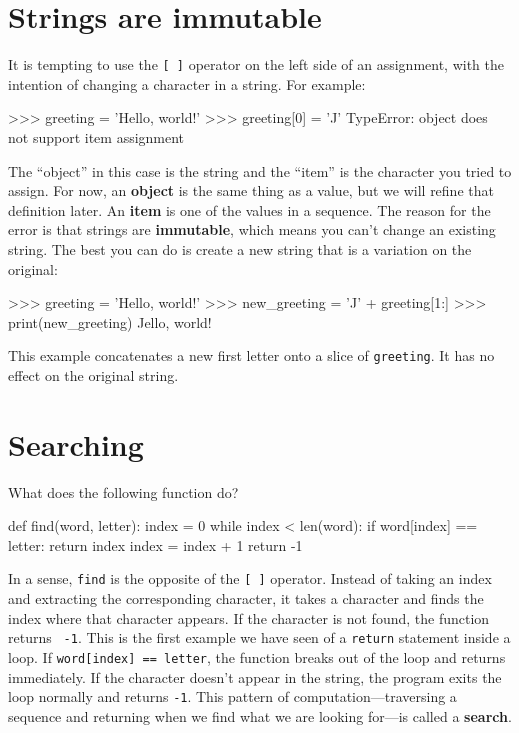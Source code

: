 \section{Strings are immutable}

It is tempting to use the {\tt [ ]} operator on the left side of an
assignment, with the intention of changing a character in a string.
For example:


\beforeverb
\begin{pyinterpreter}
>>> greeting = 'Hello, world!'
>>> greeting[0] = 'J'
TypeError: object does not support item assignment
\end{pyinterpreter}
\afterverb
%
The ``object'' in this case is the string and the ``item'' is
the character you tried to assign.  For now, an {\bf object} is
the same thing as a value, but we will refine that definition
later.  An {\bf item} is one of the values in a sequence.
%
%
The reason for the error is that
strings are {\bf immutable}, which means you can't change an
existing string.  The best you can do is create a new string
that is a variation on the original:

\beforeverb
\begin{pyinterpreter}
>>> greeting = 'Hello, world!'
>>> new_greeting = 'J' + greeting[1:]
>>> print(new_greeting)
Jello, world!
\end{pyinterpreter}
\afterverb
%
This example concatenates a new first letter onto
a slice of {\tt greeting}.  It has no effect on
the original string.



\section{Searching}
\label{find}

What does the following function do?


\beforeverb
\begin{pycode}
def find(word, letter):
    index = 0
    while index < len(word):
        if word[index] == letter:
            return index
        index = index + 1
    return -1
\end{pycode}
\afterverb
%
In a sense, {\tt find} is the opposite of the {\tt [ ]} operator.
Instead of taking an index and extracting the corresponding character,
it takes a character and finds the index where that character
appears.  If the character is not found, the function returns {\tt
-1}.
%
This is the first example we have seen of a {\tt return} statement
inside a loop.  If {\tt word[index] == letter}, the function breaks
out of the loop and returns immediately.
%
If the character doesn't appear in the string, the program
exits the loop normally and  returns {\tt -1}.
%
This pattern of computation---traversing a sequence and returning
when we find what we are looking for---is called a {\bf search}.

